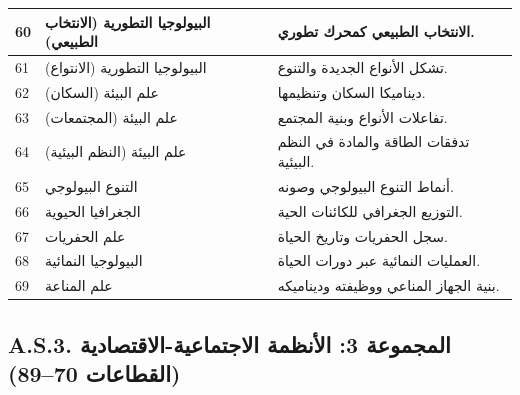 \documentclass[13pt,a4paper]{article}
\begin{document}
\begin{longtable}{|p{0.9cm}|p{6.0cm}|p{8.6cm}|}
		\hline
		60 & البيولوجيا التطورية (الانتخاب الطبيعي) & الانتخاب الطبيعي كمحرك تطوري. \\
		\hline
		61 & البيولوجيا التطورية (الانتواع) & تشكل الأنواع الجديدة والتنوع. \\
		\hline
		62 & علم البيئة (السكان) & ديناميكا السكان وتنظيمها. \\
		\hline
		63 & علم البيئة (المجتمعات) & تفاعلات الأنواع وبنية المجتمع. \\
		\hline
		64 & علم البيئة (النظم البيئية) & تدفقات الطاقة والمادة في النظم البيئية. \\
		\hline
		65 & التنوع البيولوجي & أنماط التنوع البيولوجي وصونه. \\
		\hline
		66 & الجغرافيا الحيوية & التوزيع الجغرافي للكائنات الحية. \\
		\hline
		67 & علم الحفريات & سجل الحفريات وتاريخ الحياة. \\
		\hline
		68 & البيولوجيا النمائية & العمليات النمائية عبر دورات الحياة. \\
		\hline
		69 & علم المناعة & بنية الجهاز المناعي ووظيفته وديناميكه. \\
		\hline
	\end{longtable}
	
	\subsection*{A.S.3. المجموعة 3: الأنظمة الاجتماعية-الاقتصادية (القطاعات 70--89)}
	
\end{document}
